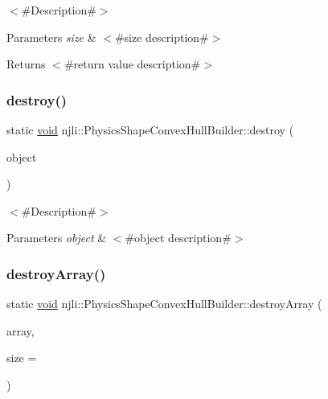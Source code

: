 $<$\#\+Description\#$>$


\begin{DoxyParams}{Parameters}
{\em size} & $<$\#size description\#$>$\\
\hline
\end{DoxyParams}
\begin{DoxyReturn}{Returns}
$<$\#return value description\#$>$ 
\end{DoxyReturn}
\mbox{\label{classnjli_1_1_physics_shape_convex_hull_builder_a14327ed45eea52c4c0149b2d79d4603a}} 
\subsubsection{\texorpdfstring{destroy()}{destroy()}}
{\footnotesize\ttfamily static \mbox{\hyperlink{_thread_8h_af1e856da2e658414cb2456cb6f7ebc66}{void}} njli\+::\+Physics\+Shape\+Convex\+Hull\+Builder\+::destroy (\begin{DoxyParamCaption}\item[{\mbox{\hyperlink{classnjli_1_1_physics_shape_convex_hull_builder}{Physics\+Shape\+Convex\+Hull\+Builder}} $\ast$}]{object }\end{DoxyParamCaption})\hspace{0.3cm}{\ttfamily [static]}}

$<$\#\+Description\#$>$


\begin{DoxyParams}{Parameters}
{\em object} & $<$\#object description\#$>$ \\
\hline
\end{DoxyParams}
\mbox{\label{classnjli_1_1_physics_shape_convex_hull_builder_a46350533a0425e6e6b6627eba62a535b}} 
\subsubsection{\texorpdfstring{destroy\+Array()}{destroyArray()}}
{\footnotesize\ttfamily static \mbox{\hyperlink{_thread_8h_af1e856da2e658414cb2456cb6f7ebc66}{void}} njli\+::\+Physics\+Shape\+Convex\+Hull\+Builder\+::destroy\+Array (\begin{DoxyParamCaption}\item[{\mbox{\hyperlink{classnjli_1_1_physics_shape_convex_hull_builder}{Physics\+Shape\+Convex\+Hull\+Builder}} $\ast$$\ast$}]{array,  }\item[{const \mbox{\hyperlink{_util_8h_a10e94b422ef0c20dcdec20d31a1f5049}{u32}}}]{size = {} }\end{DoxyParamCaption})\hspace{0.3cm}{\ttfamily [static]}}

